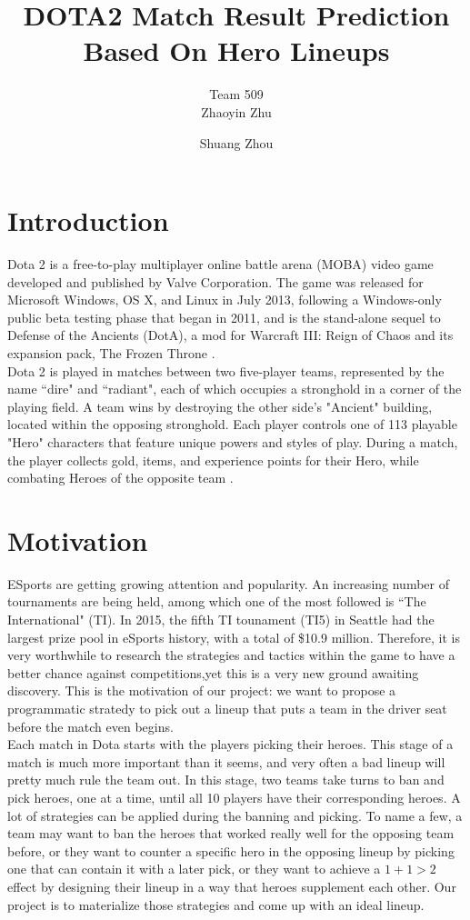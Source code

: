 \documentclass[11pt]{article}
\title{DOTA2 Match Result Prediction Based On Hero Lineups}
\author[1]{Team 509\\Zhaoyin Zhu}
\author[2]{Shuang Zhou}
\affil[1]{Division of Biostatistics, School of Medicine, New York University}
\affil[2]{Department of Computer Science, New York University}
\begin{document}
\maketitle

\section{Introduction}
Dota 2 is a free-to-play multiplayer online battle arena (MOBA) video game developed and published by Valve Corporation. The game was released for Microsoft Windows, OS X, and Linux in July 2013, following a Windows-only public beta testing phase that began in 2011, and is the stand-alone sequel to Defense of the Ancients (DotA), a mod for Warcraft III: Reign of Chaos and its expansion pack, The Frozen Throne \cite{dota2}.\\

\noindent Dota 2 is played in matches between two five-player teams, represented by the name ``dire" and ``radiant", each of which occupies a stronghold in a corner of the playing field. A team wins by destroying the other side's "Ancient" building, located within the opposing stronghold. Each player controls one of 113 playable "Hero" characters that feature unique powers and styles of play. During a match, the player collects gold, items, and experience points for their Hero, while combating Heroes of the opposite team \cite{dota2}.

\section{Motivation}
ESports are getting growing attention and popularity. An increasing number of tournaments are being held, among which one of the most followed is ``The International" (TI). In 2015, the fifth TI tounament (TI5) in Seattle had the largest prize pool in eSports history, with a total of \$10.9 million\cite{ti5}. Therefore, it is very worthwhile to research the strategies and tactics within the game to have a better chance against competitions,yet this is a very new ground awaiting discovery. This is the motivation of our project: we want to propose a programmatic stratedy to pick out a lineup that puts a team in the driver seat before the match even begins.\\

\noindent Each match in Dota starts with the players picking their heroes. This stage of a match is much more important than it seems, and very often a bad lineup will pretty much rule the team out. In this stage, two teams take turns to ban and pick heroes, one at a time, until all 10 players have their corresponding heroes. A lot of strategies can be applied during the banning and picking. To name a few, a team may want to ban the heroes that worked really well for the opposing team before, or they want to counter a specific hero in the opposing lineup by picking one that can contain it with a later pick, or they want to achieve a $1+1>2$ effect by designing their lineup in a way that heroes supplement each other. Our project is to materialize those strategies and come up with an ideal lineup.
\end{document}
